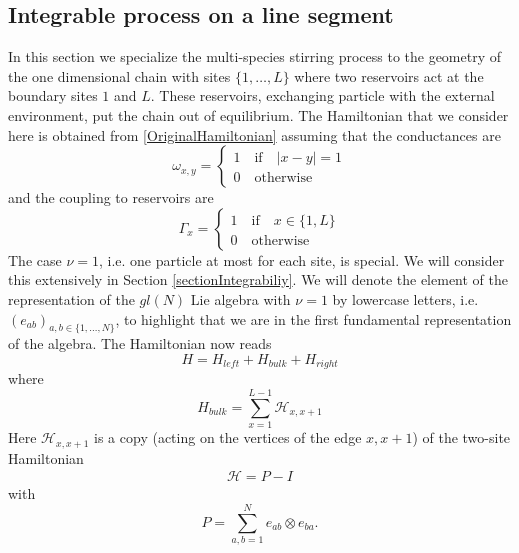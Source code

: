\documentclass[10pt]{article}
\numberwithin{equation}{section}
\numberwithin{equation}{subsection}
\newcommand{\id}{I}
\begin{document}
\subsection{Integrable process on a line segment}\label{subsection-description-process-LINE}
In this section we specialize the multi-species stirring process to the geometry of the one dimensional chain with sites $\{1,\ldots,L\}$ where two reservoirs act at the boundary sites $1$ and $L$. These reservoirs, exchanging particle with the external environment, put the chain out of equilibrium. The Hamiltonian that we consider here is obtained from \eqref{OriginalHamiltonian} assuming that the conductances are
\begin{equation}
	\omega_{x,y}=\begin{cases}
		1 \quad \text{if}\quad |x-y|=1\\
		0\quad \text{otherwise}
	\end{cases}
\end{equation}
and the coupling to reservoirs are
\begin{equation}
	\Gamma_{x}=\begin{cases}
		1\quad \text{if} \quad x\in \{1,L\}\\
		0\quad \text{otherwise}
	\end{cases}
\end{equation}
The case $\nu=1$, i.e. one particle at most for each site, is special. We will consider this extensively in Section \ref{sectionIntegrabiliy}.
We will denote the element of the representation of the $gl(N)$  Lie algebra with $\nu=1$ by lowercase letters, i.e. $(e_{ab})_{a,b\in\{1,\ldots,N\}}$, to highlight that we are in the first fundamental representation of the algebra.
The Hamiltonian now reads
\begin{equation}\label{hamiltonian}
	H=H_{left}+H_{bulk}+H_{right}
\end{equation}
where
\begin{equation}
	H_{bulk}=\sum_{x=1}^{L-1}\mathcal{H}_{x,x+1}
\end{equation}
Here $\mathcal{H}_{x,x+1}$  is a copy (acting on the vertices of the edge $x,x+1$) of the two-site Hamiltonian
\begin{equation}\label{H-corsivo}
	\begin{split}
		\mathcal{H}=P-\id
	\end{split}
\end{equation}
with 
\begin{equation}
	P=\sum_{a,b=1}^Ne_{ab}\otimes e_{ba}.
\end{equation} 
\end{document}
